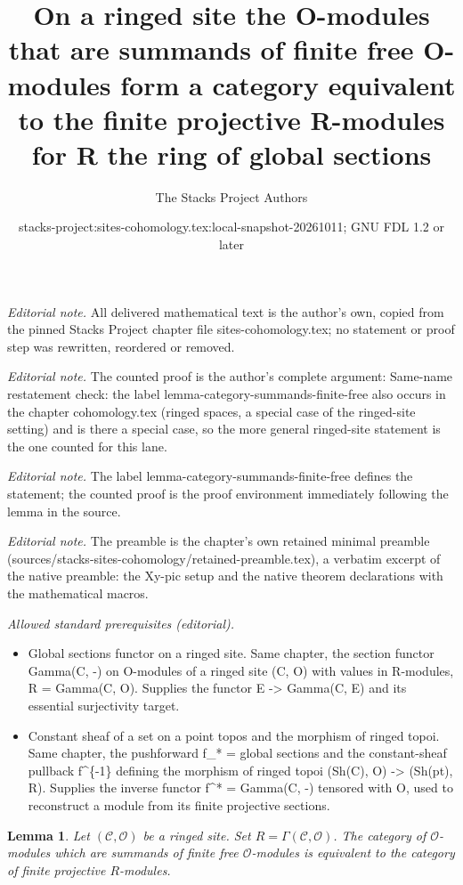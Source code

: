 \documentclass[10pt,a4paper]{amsart}
\title{On a ringed site the O-modules that are summands of finite free O-modules form a category equivalent to the finite projective R-modules for R the ring of global sections}
\author{The Stacks Project Authors}
\date{stacks-project:sites-cohomology.tex:local-snapshot-20261011; GNU FDL 1.2 or later}
\theoremstyle{plain}
\newtheorem{lemma}[subsection]{Lemma}
\theoremstyle{definition}
\theoremstyle{remark}
\numberwithin{equation}{subsection}
\begin{document}
\maketitle
\noindent\textit{Editorial note.} All delivered mathematical text is the author's own, copied from the pinned Stacks Project chapter file sites-cohomology.tex; no statement or proof step was rewritten, reordered or removed.\par\medskip
\noindent\textit{Editorial note.} The counted proof is the author's complete argument: Same-name restatement check: the label lemma-category-summands-finite-free also occurs in the chapter cohomology.tex (ringed spaces, a special case of the ringed-site setting) and is there a special case, so the more general ringed-site statement is the one counted for this lane.\par\medskip
\noindent\textit{Editorial note.} The label lemma-category-summands-finite-free defines the statement; the counted proof is the proof environment immediately following the lemma in the source.\par\medskip
\noindent\textit{Editorial note.} The preamble is the chapter's own retained minimal preamble (sources/stacks-sites-cohomology/retained-preamble.tex), a verbatim excerpt of the native preamble: the Xy-pic setup and the native theorem declarations with the mathematical macros.\par\medskip
\noindent\textit{Allowed standard prerequisites (editorial).}\begin{itemize}
\item Global sections functor on a ringed site. Same chapter, the section functor Gamma(C, -) on O-modules of a ringed site (C, O) with values in R-modules, R = Gamma(C, O). Supplies the functor E -> Gamma(C, E) and its essential surjectivity target.
\item Constant sheaf of a set on a point topos and the morphism of ringed topoi. Same chapter, the pushforward f\_* = global sections and the constant-sheaf pullback f\textasciicircum{}\{-1\} defining the morphism of ringed topoi (Sh(C), O) -> (Sh(pt), R). Supplies the inverse functor f\textasciicircum{}* = Gamma(C, -) tensored with O, used to reconstruct a module from its finite projective sections.
\end{itemize}\medskip
\begin{lemma}
\label{lemma-category-summands-finite-free}
Let $(\mathcal{C}, \mathcal{O})$ be a ringed site.
Set $R = \Gamma(\mathcal{C}, \mathcal{O})$. The category of
$\mathcal{O}$-modules which are summands of finite free
$\mathcal{O}$-modules is equivalent to the category of
finite projective $R$-modules.
\end{lemma}
\end{document}
